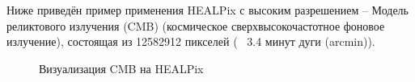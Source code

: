 \documentclass[14pt]{article} %
\begin{document}
Ниже приведён пример применения HEALPix с высоким разрешением -- Модель реликтового излучения (CMB) (космическое сверхвысокочастотное фоновое излучение), состоящая из 12582912 пикселей (~ 3.4 минут дуги (arcmin)).


\begin{figure}[h]
\begin{minipage}[h]{0.3\linewidth}
\end{minipage}
\hfill
\begin{minipage}[h]{0.69\linewidth}
\end{minipage}
\caption{Визуализация CMB на HEALPix}
\label{ris:image1}
\end{figure}
\end{document}
